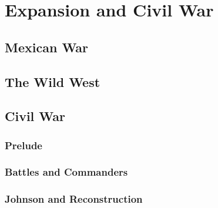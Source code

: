 \chapter{Expansion and Civil War}

\section{Mexican War}

\section{The Wild West}

\section{Civil War}

\subsection*{Prelude}

\subsection*{Battles and Commanders}

\subsection*{Johnson and Reconstruction}
